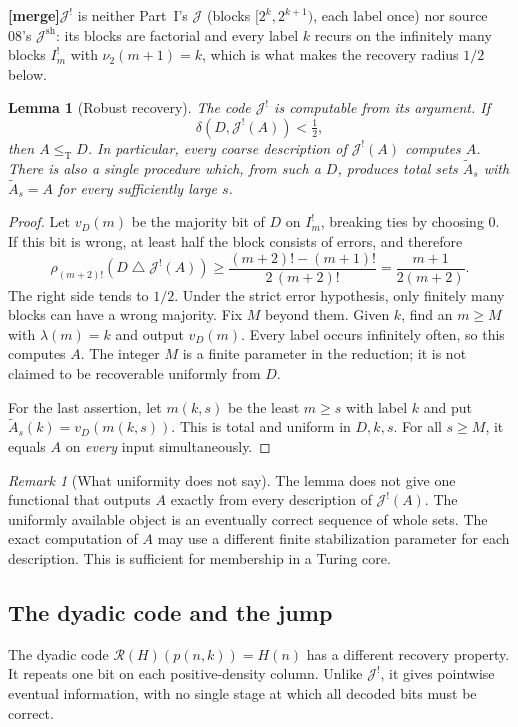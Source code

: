 \documentclass[11pt,letterpaper]{article}
\theoremstyle{plain}
\newtheorem{lemma}[theorem]{Lemma}
\theoremstyle{definition}
\theoremstyle{remark}
\newtheorem{remark}[theorem]{Remark}
\numberwithin{equation}{section}
\newcommand{\leT}{\leq_{\mathrm T}}
\newcommand{\Rcode}{\mathcal R}
\newcommand{\Jcode}{\mathcal J}
\newcommand{\sd}{\mathbin{\triangle}}
\newcommand{\mergenote}[1]{\par\smallskip\noindent
 {\small\textsf{\textbf{[merge]}}\enspace #1}\par\smallskip}
\newcommand{\Jsh}{\mathcal J^{\mathrm{sh}}} %
\newcommand{\Jfac}{\mathcal J^{!}}       %
\begin{document}
\mergenote{$\Jfac$ is neither Part~I's $\Jcode$ (blocks $[2^k,2^{k+1})$, each label once)
nor source 08's $\Jsh$: its blocks are factorial and every label $k$ recurs on the
infinitely many blocks $I^!_m$ with $\nu_2(m+1)=k$, which is what makes the recovery
radius $1/2$ below.}

\begin{lemma}[Robust recovery]\label{cr12:lr:lem:robust}
The code $\Jfac$ is computable from its argument. If
\[
 \delta(D,\Jfac(A))<\tfrac12,
\]
then $A\leT D$. In particular, every coarse description of $\Jfac(A)$ computes $A$.
There is also a single procedure which, from such a $D$, produces total sets
$\tilde A_s$ with $\tilde A_s=A$ for every sufficiently large $s$.
\end{lemma}
\begin{proof}
Let $v_D(m)$ be the majority bit of $D$ on $I^!_m$, breaking ties by choosing $0$. If
this bit is wrong, at least half the block consists of errors, and therefore
\[
 \rho_{(m+2)!}(D\sd\Jfac(A))\geq
 \frac{(m+2)!-(m+1)!}{2\,(m+2)!}
 =\frac{m+1}{2(m+2)}.
\]
The right side tends to $1/2$. Under the strict error hypothesis, only finitely many
blocks can have a wrong majority. Fix $M$ beyond them. Given $k$, find an $m\geq M$
with $\lambda(m)=k$ and output $v_D(m)$. Every label occurs infinitely often, so this
computes $A$. The integer $M$ is a finite parameter in the reduction; it is not claimed
to be recoverable uniformly from $D$.

For the last assertion, let $m(k,s)$ be the least $m\geq s$ with label $k$ and put
$\tilde A_s(k)=v_D(m(k,s))$. This is total and uniform in $D,k,s$. For all $s\geq M$,
it equals $A$ on \emph{every} input simultaneously.
\end{proof}

\begin{remark}[What uniformity does not say]
The lemma does not give one functional that outputs $A$ exactly from every
description of $\Jfac(A)$. The uniformly available object is an eventually correct
sequence of whole sets. The exact computation of $A$ may use a different finite
stabilization parameter for each description. This is sufficient for membership in a
Turing core.
\end{remark}

\subsection{The dyadic code and the jump}
The dyadic code $\Rcode(H)(p(n,k))=H(n)$ has a different recovery property. It repeats
one bit on each positive-density column. Unlike $\Jfac$, it gives pointwise eventual
information, with no single stage at which all decoded bits must be correct.
\end{document}
